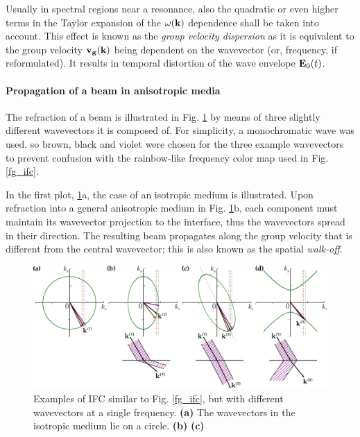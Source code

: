 Usually in spectral regions near a resonance, also the quadratic or even higher terms in the Taylor expansion of the $\omega({\mathbf{k}})$ dependence shall be taken into account. This effect is known as the \textit{group velocity dispersion} as it is equivalent to the group velocity ${\mathbf{v_g}}({\mathbf{k}})$ being dependent on the wavevector (or, frequency, if reformulated). It results in temporal distortion of the wave envelope $\mathbf{E}_0(t)$.  %

\paragraph{Propagation of a beam in anisotropic media}  %
The refraction of a beam is illustrated in Fig. \ref{fg_ifc2} by means of three slightly different wavevectors it is composed of. For simplicity, a monochromatic wave was used, so brown, black and violet were chosen for the three example wavevectors to prevent confusion with the rainbow-like frequency color map used in Fig. \ref{fg_ifc}. 

In the first plot, \ref{fg_ifc2}a, the case of an isotropic medium is illustrated. Upon refraction into a general anisotropic medium in Fig. \ref{fg_ifc2}b, each component must maintain its wavevector projection to the interface, thus the wavevectors spread in their direction. The resulting beam propagates along the group velocity that is different from the central wavevector; %
this is also known as the spatial \textit{walk-off}.
\begin{figure}[ht] \caption{Examples of IFC similar to Fig. \ref{fg_ifc}, but with different wavevectors at a single frequency. \textbf{(a)} The wavevectors in the isotropic medium lie on a circle.
 \textbf{(b)} \textbf{(c)} } \label{fg_ifc2} \centering  %
	\includegraphics[width=\textwidth]{img/ifc_kdispersion_hyp.pdf} 
\end{figure}


